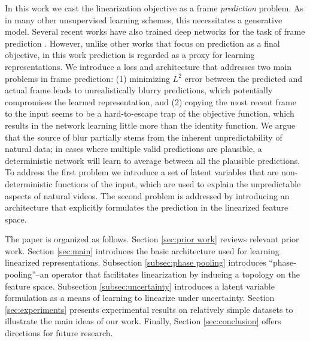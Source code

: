 \documentclass{article} %
\begin{document}
In this work we cast the linearization objective as a frame \emph{prediction} problem. As in many other unsupervised learning schemes, this necessitates a generative model. Several recent works have also trained deep networks for the task of frame prediction \cite{FBvideo}\cite{supFromTracker}\cite{predAlexNet}. However, unlike other works that focus on prediction as a final objective, in this work prediction is regarded as a proxy for learning representations. We introduce a loss and architecture that addresses two main problems in frame prediction: (1) minimizing $L^2$ error between the predicted and actual frame leads to unrealistically blurry predictions, which potentially compromises the learned representation, and (2) copying the most recent frame to the input seems to be a hard-to-escape trap of the objective function,  which results in the network learning little more than the identity function. We argue that the source of blur partially stems from the inherent unpredictability of natural data; in cases where multiple valid predictions are plausible, a deterministic network will learn to average between all the plausible predictions. To address the first problem we introduce a set of latent variables that are non-deterministic functions of the input, which are used to explain the unpredictable aspects of natural videos. The second problem is addressed by introducing an architecture that explicitly formulates the prediction in the linearized feature space. 

The paper is organized as follows. Section \ref{sec:prior work} reviews relevant prior work. Section \ref{sec:main} introduces the basic architecture used for learning linearized representations.  Subsection \ref{subsec:phase pooling} introduces ``phase-pooling''--an operator that facilitates linearization by inducing a topology on the feature space. Subsection \ref{subsec:uncertainty} introduces a latent variable formulation as a means of learning to linearize under uncertainty. Section \ref{sec:experiments} presents experimental results on relatively simple datasets to illustrate the main ideas of our work. Finally, Section \ref{sec:conclusion} offers directions for future research. 
      
\end{document}
